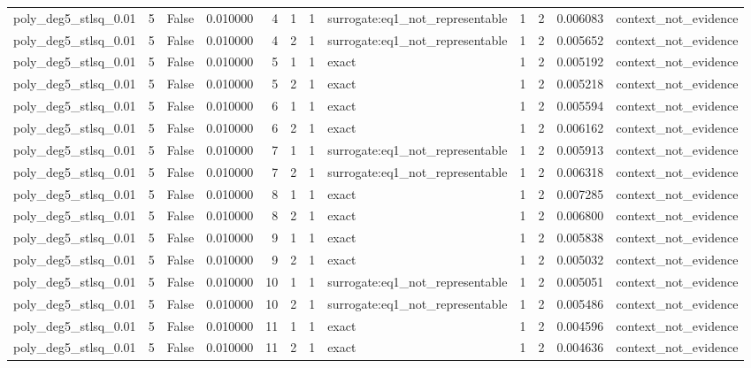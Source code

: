 \begin{tabular}{lrrrrrrlrrrl}
poly\_deg5\_stlsq\_0.01 & 5 & False & 0.010000 & 4 & 1 & 1 & surrogate:eq1\_not\_representable & 1 & 2 & 0.006083 & context\_not\_evidence \\
poly\_deg5\_stlsq\_0.01 & 5 & False & 0.010000 & 4 & 2 & 1 & surrogate:eq1\_not\_representable & 1 & 2 & 0.005652 & context\_not\_evidence \\
poly\_deg5\_stlsq\_0.01 & 5 & False & 0.010000 & 5 & 1 & 1 & exact & 1 & 2 & 0.005192 & context\_not\_evidence \\
poly\_deg5\_stlsq\_0.01 & 5 & False & 0.010000 & 5 & 2 & 1 & exact & 1 & 2 & 0.005218 & context\_not\_evidence \\
poly\_deg5\_stlsq\_0.01 & 5 & False & 0.010000 & 6 & 1 & 1 & exact & 1 & 2 & 0.005594 & context\_not\_evidence \\
poly\_deg5\_stlsq\_0.01 & 5 & False & 0.010000 & 6 & 2 & 1 & exact & 1 & 2 & 0.006162 & context\_not\_evidence \\
poly\_deg5\_stlsq\_0.01 & 5 & False & 0.010000 & 7 & 1 & 1 & surrogate:eq1\_not\_representable & 1 & 2 & 0.005913 & context\_not\_evidence \\
poly\_deg5\_stlsq\_0.01 & 5 & False & 0.010000 & 7 & 2 & 1 & surrogate:eq1\_not\_representable & 1 & 2 & 0.006318 & context\_not\_evidence \\
poly\_deg5\_stlsq\_0.01 & 5 & False & 0.010000 & 8 & 1 & 1 & exact & 1 & 2 & 0.007285 & context\_not\_evidence \\
poly\_deg5\_stlsq\_0.01 & 5 & False & 0.010000 & 8 & 2 & 1 & exact & 1 & 2 & 0.006800 & context\_not\_evidence \\
poly\_deg5\_stlsq\_0.01 & 5 & False & 0.010000 & 9 & 1 & 1 & exact & 1 & 2 & 0.005838 & context\_not\_evidence \\
poly\_deg5\_stlsq\_0.01 & 5 & False & 0.010000 & 9 & 2 & 1 & exact & 1 & 2 & 0.005032 & context\_not\_evidence \\
poly\_deg5\_stlsq\_0.01 & 5 & False & 0.010000 & 10 & 1 & 1 & surrogate:eq1\_not\_representable & 1 & 2 & 0.005051 & context\_not\_evidence \\
poly\_deg5\_stlsq\_0.01 & 5 & False & 0.010000 & 10 & 2 & 1 & surrogate:eq1\_not\_representable & 1 & 2 & 0.005486 & context\_not\_evidence \\
poly\_deg5\_stlsq\_0.01 & 5 & False & 0.010000 & 11 & 1 & 1 & exact & 1 & 2 & 0.004596 & context\_not\_evidence \\
poly\_deg5\_stlsq\_0.01 & 5 & False & 0.010000 & 11 & 2 & 1 & exact & 1 & 2 & 0.004636 & context\_not\_evidence \\

\end{tabular}
